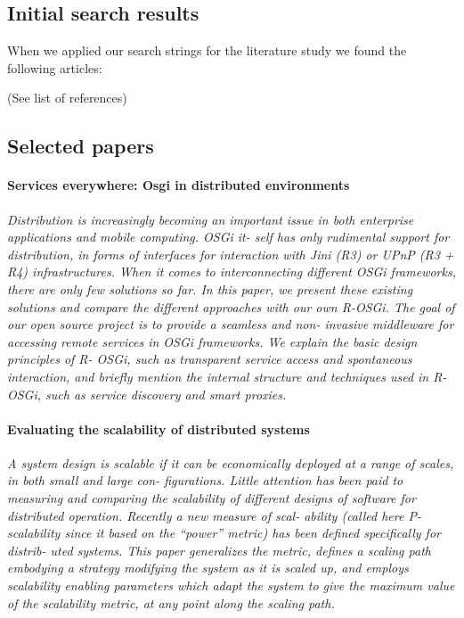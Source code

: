 \documentclass{article}
\begin{document}
\subsection{Initial search results}
When we applied our search strings for the literature study we found the
following articles:

(See list of references)

\subsection{Selected papers}
\paragraph{Services everywhere: Osgi in distributed environments}
\cite{rellermeyer2007services}

\emph{Distribution is increasingly becoming an important issue in both
enterprise applications and mobile computing. OSGi it- self has only rudimental
support for distribution, in forms of interfaces for interaction with Jini (R3)
or UPnP (R3 + R4) infrastructures. When it comes to interconnecting different
OSGi frameworks, there are only few solutions so far. In this paper, we present
these existing solutions and compare the different approaches with our own
R-OSGi. The goal of our open source project is to provide a seamless and non-
invasive middleware for accessing remote services in OSGi frameworks. We
explain the basic design principles of R- OSGi, such as transparent service
access and spontaneous interaction, and briefly mention the internal structure
and techniques used in R-OSGi, such as service discovery and smart proxies.}

\paragraph{Evaluating the scalability of distributed systems}
\cite{jogalekar2000evaluating}

\emph{A system design is scalable if it can be economically deployed at a range
of scales, in both small and large con- figurations. Little attention has been
paid to measuring and comparing the scalability of different designs of
software for distributed operation. Recently a new measure of scal- ability
(called here P-scalability since it based on the “power” metric) has been
defined specifically for distrib- uted systems. This paper generalizes the
metric, defines a scaling path embodying a strategy modifying the system as it
is scaled up, and employs scalability enabling parameters which adapt the
system to give the maximum value of the scalability metric, at any point along
the scaling path.}
\end{document}
